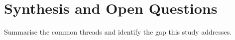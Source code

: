 \section{Synthesis and Open Questions}
\label{sec:learnt-synthesis}


Summarise the common threads and identify the gap this study addresses.
